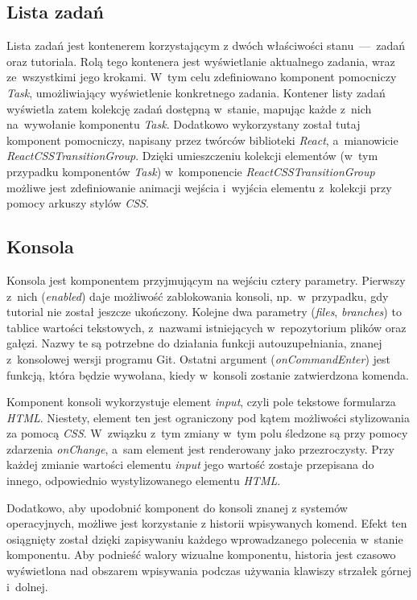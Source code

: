 \documentclass[12pt,a4paper,polish,thesis]{dcsbook}
\begin{document}
{	\subsection{Lista zadań}

	Lista zadań jest kontenerem korzystającym z dwóch właściwości stanu~---~zadań oraz tutoriala. Rolą tego kontenera jest wyświetlanie aktualnego zadania, wraz ze~wszystkimi jego krokami. W~tym celu zdefiniowano komponent pomocniczy \textit{Task}, umożliwiający wyświetlenie konkretnego zadania. Kontener listy zadań wyświetla zatem kolekcję zadań dostępną w~stanie, mapując każde z~nich na~wywołanie komponentu \textit{Task}. Dodatkowo wykorzystany został tutaj komponent pomocniczy, napisany przez twórców biblioteki \textit{React}, a~mianowicie \textit{ReactCSSTransitionGroup}. Dzięki umieszczeniu kolekcji elementów (w~tym przypadku komponentów \textit{Task}) w~komponencie \textit{ReactCSSTransitionGroup} możliwe jest zdefiniowanie animacji wejścia i~wyjścia elementu z~kolekcji przy pomocy arkuszy stylów \textit{CSS}.

	\subsection{Konsola}

	Konsola jest komponentem przyjmującym na wejściu cztery parametry. Pierwszy z~nich (\textit{enabled}) daje możliwość zablokowania konsoli, np.~w~przypadku, gdy tutorial nie został jeszcze ukończony. Kolejne dwa parametry (\textit{files}, \textit{branches}) to tablice wartości tekstowych, z~nazwami istniejących w~repozytorium plików oraz gałęzi. Nazwy te są potrzebne do działania funkcji autouzupełniania, znanej z~konsolowej wersji programu Git. Ostatni argument (\textit{onCommandEnter}) jest funkcją, która będzie wywołana, kiedy w~konsoli zostanie zatwierdzona komenda.

	Komponent konsoli wykorzystuje element \textit{input}, czyli pole tekstowe formularza \textit{HTML}. Niestety, element ten jest ograniczony pod kątem możliwości stylizowania za pomocą \textit{CSS}. W~związku z~tym zmiany w~tym polu śledzone są przy pomocy zdarzenia \textit{onChange}, a~sam element jest renderowany jako przezroczysty. Przy każdej zmianie wartości elementu \textit{input} jego wartość zostaje przepisana do innego, odpowiednio wystylizowanego elementu \textit{HTML}.

	Dodatkowo, aby upodobnić komponent do konsoli znanej z systemów operacyjnych, możliwe jest korzystanie z historii wpisywanych komend. Efekt ten osiągnięty został dzięki zapisywaniu każdego wprowadzanego polecenia w~stanie komponentu. Aby podnieść walory wizualne komponentu, historia jest czasowo wyświetlona nad obszarem wpisywania podczas używania klawiszy strzałek górnej i~dolnej.

}
\end{document}
